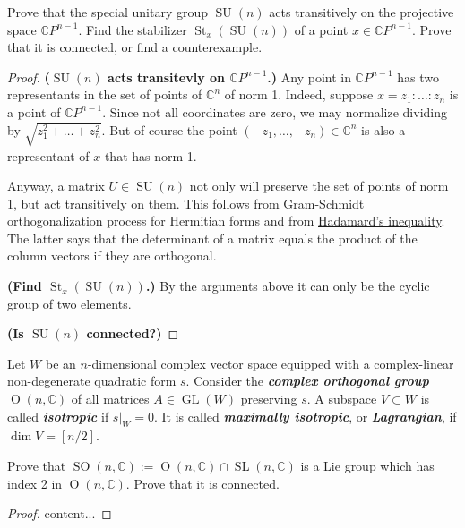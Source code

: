 \documentclass{article}
\numberwithin{equation}{section}
\newcommand{\C}{\mathbb{C}}
\renewcommand{\O}{\operatorname{O}}
\DeclareMathOperator{\GL}{GL}
\DeclareMathOperator{\SL}{SL}
\DeclareMathOperator{\SO}{SO}
\DeclareMathOperator{\SU}{SU}
\DeclareMathOperator{\St}{St}
\begin{document}
\begin{exercise}
	Prove that the special unitary group $\SU(n)$ acts transitively on the projective space $\C P^{n-1}$. Find the stabilizer $\St_x(\SU(n))$ of a point $x \in \C P^{n-1}$. Prove that it is connected, or find a counterexample.
\end{exercise}
\begin{proof}\leavevmode

	\textbf{($\SU(n)$ acts transitevly on $\C P^{n-1}$.)} Any point in $\C P^{n-1}$ has two representants in the set of points of $\C^n$ of norm 1. Indeed, suppose $x=z_1:\ldots:z_n$ is a point of $\C P^{n-1}$. Since not all coordinates are zero, we may normalize dividing by $\sqrt{z^2_1+\ldots+z^2_n}$. But of course the point $(-z_1,\ldots,-z_n)\in\C^n$ is also a representant of $x$ that has norm 1.
	
	Anyway, a matrix $U\in\SU(n)$ not only will preserve the set of points of norm 1, but act transitively on them. This follows from Gram-Schmidt orthogonalization process for Hermitian forms and from \href{https://en.wikipedia.org/wiki/Hadamard%27s_inequality}{Hadamard's inequality}. The latter says that the determinant of a matrix equals the product of the column vectors if they are orthogonal.
	
	\textbf{(Find $\St_x(\SU(n))$.)} By the arguments above it can only be the cyclic group of two elements.
	
	\textbf{(Is $\SU(n)$ connected?)}
\end{proof}

\begin{defn}
	Let $W$ be an $n$-dimensional complex vector space equipped with a complex-linear non-degenerate quadratic form $s$. Consider the \textbf{\textit{complex orthogonal group}} $\O(n,\C)$ of all matrices $A \in \GL(W )$ preserving $s$. A subspace $V \subset W$ is called \textbf{\textit{isotropic}} if $s|_W = 0$. It is called \textbf{\textit{maximally isotropic}}, or \textbf{\textit{Lagrangian}}, if $\dim V = [n/2]$.
\end{defn}

\begin{exercise}
	Prove that $\SO(n, \C) := \O(n, \C) \cap \SL(n, \C)$ is a Lie group
	which has index 2 in $\O(n, \C)$. Prove that it is connected.
\end{exercise}
\begin{proof}
	content...
\end{proof}
\end{document}
